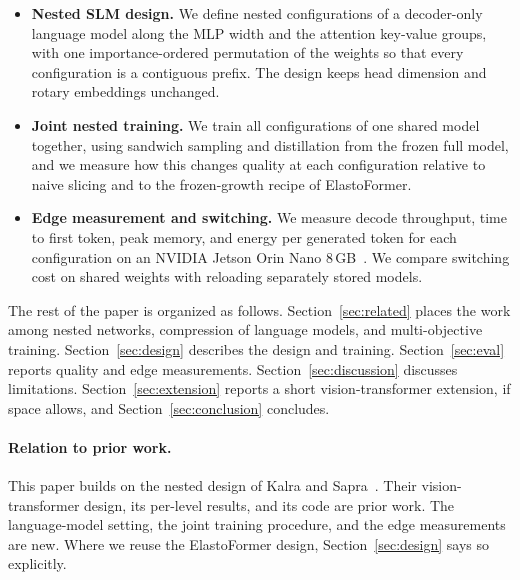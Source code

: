 \begin{itemize}
  \item \textbf{Nested SLM design.} We define nested configurations of a decoder-only language model along the MLP width and the attention key-value groups, with one importance-ordered permutation of the weights so that every configuration is a contiguous prefix. The design keeps head dimension and rotary embeddings unchanged. 
  \item \textbf{Joint nested training.} We train all configurations of one shared model together, using sandwich sampling and distillation from the frozen full model, and we measure how this changes quality at each configuration relative to naive slicing and to the frozen-growth recipe of ElastoFormer. 
  \item \textbf{Edge measurement and switching.} We measure decode throughput, time to first token, peak memory, and energy per generated token for each configuration on an NVIDIA Jetson Orin Nano 8\,GB~\cite{jetson2024orinnano}. We compare switching cost on shared weights with reloading separately stored models. 
\end{itemize}

The rest of the paper is organized as follows. Section~\ref{sec:related} places the work among nested networks, compression of language models, and multi-objective training. Section~\ref{sec:design} describes the design and training. Section~\ref{sec:eval} reports quality and edge measurements. Section~\ref{sec:discussion} discusses limitations. Section~\ref{sec:extension} reports a short vision-transformer extension, if space allows, and Section~\ref{sec:conclusion} concludes.

\paragraph{Relation to prior work.} This paper builds on the nested design of Kalra and Sapra~\cite{kalra2025elastoformer}. Their vision-transformer design, its per-level results, and its code are prior work. The language-model setting, the joint training procedure, and the edge measurements are new. Where we reuse the ElastoFormer design, Section~\ref{sec:design} says so explicitly.
